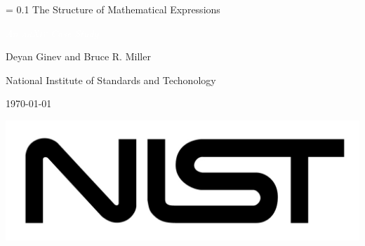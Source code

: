 \newlength{\drop}%

\renewcommand{\maketitle}{\begingroup%
\drop = 0.1\textheight
\fboxsep 0.5\baselineskip
\sffamily
\vspace*{\drop}
\centering
{\textcolor{NavyBlue}{\HUGE The Structure of Mathematical Expressions}}\par
\vspace{0.5\drop}
\colorbox{Dark}{\textcolor{white}{\normalfont\itshape\Large
An {\textsc{arXiv}} Case Study}}\par
\vspace{\drop}
{\Large Deyan Ginev and Bruce R. Miller}\par
\vspace{0.05\textheight}
{\large National Institute of Standards and Techonology}\par
\vfill
{\begin{center}\today\end{center}}
\vspace*{\drop}
{\hfill\includegraphics{NIST}}
\endgroup}
\makeatother

\pagestyle{empty}
\maketitle
\newpage